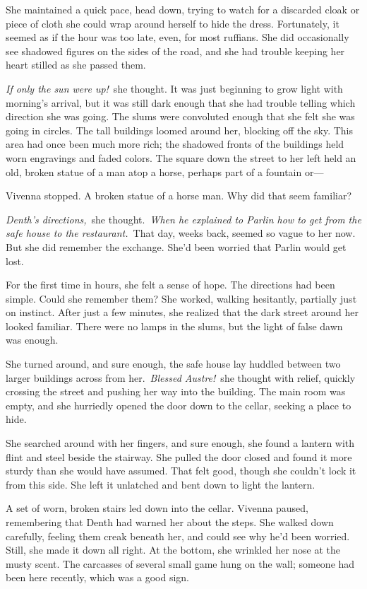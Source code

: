 She maintained a quick pace, head down, trying to watch for a discarded cloak or piece of cloth she could wrap around herself to hide the dress. Fortunately, it seemed as if the hour was too late, even, for most ruffians. She did occasionally see shadowed figures on the sides of the road, and she had trouble keeping her heart stilled as she passed them.

\textit{If only the sun were up!}~she thought. It was just beginning to grow light with morning’s arrival, but it was still dark enough that she had trouble telling which direction she was going. The slums were convoluted enough that she felt she was going in circles. The tall buildings loomed around her, blocking off the sky. This area had once been much more rich; the shadowed fronts of the buildings held worn engravings and faded colors. The square down the street to her left held an old, broken statue of a man atop a horse, perhaps part of a fountain or—

Vivenna stopped. A broken statue of a horse man. Why did that seem familiar?

\textit{Denth’s directions,}~she thought.~\textit{When he explained to Parlin how to get from the safe house to the restaurant.}~That day, weeks back, seemed so vague to her now. But she did remember the exchange. She’d been worried that Parlin would get lost.

For the first time in hours, she felt a sense of hope. The directions had been simple. Could she remember them? She worked, walking hesitantly, partially just on instinct. After just a few minutes, she realized that the dark street around her looked familiar. There were no lamps in the slums, but the light of false dawn was enough.

She turned around, and sure enough, the safe house lay huddled between two larger buildings across from her.~\textit{Blessed Austre!}~she thought with relief, quickly crossing the street and pushing her way into the building. The main room was empty, and she hurriedly opened the door down to the cellar, seeking a place to hide.

She searched around with her fingers, and sure enough, she found a lantern with flint and steel beside the stairway. She pulled the door closed and found it more sturdy than she would have assumed. That felt good, though she couldn’t lock it from this side. She left it unlatched and bent down to light the lantern.

A set of worn, broken stairs led down into the cellar. Vivenna paused, remembering that Denth had warned her about the steps. She walked down carefully, feeling them creak beneath her, and could see why he’d been worried. Still, she made it down all right. At the bottom, she wrinkled her nose at the musty scent. The carcasses of several small game hung on the wall; someone had been here recently, which was a good sign.


